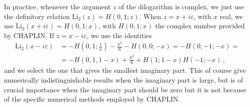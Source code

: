 \documentclass[12pt]{article}
\begin{document}
In practice, whenever the argument $z$ of the dilogarithm is complex,
we just use the definitory relation $\mathrm{Li_2}(z)=H(0,1;z)$. When
$z=x+i\varepsilon$, with $x$ real, we use
$\mathrm{Li_2}(x+i\varepsilon)=H(0,1;x)$, with $H(0,1;x)$ the complex
number provided by CHAPLIN. If $z=x-i\varepsilon$, we use the
identities
\begin{equation}
  \begin{split}
\mathrm{Li}_{2}\left ( x-i\varepsilon \right )&= -H\left(0,1;\frac{1}{x} \right ) - \frac{\pi^2}{6} - H(0,0; -x)  = -H(0,-1;-x) = \\ & 
= -H\left (0,1, 1-x \right )+ \frac{\pi^2}{6} + H(1;1-x) H(-1;-x)\,,
  \end{split}
\end{equation}
and we select the one that gives the smallest imaginary part. This of course give numerically indistinguishable results when the imaginary part is large, but is of
crucial importance when the imaginary part should be zero but it is
not because of the specific numerical methods employed by CHAPLIN.



%


\end{document}
